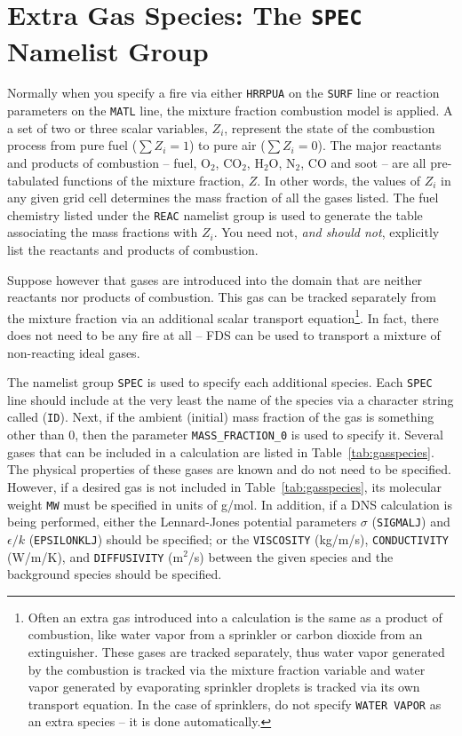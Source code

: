 \documentclass[11pt]{book}
\newcommand{\ct}{\tt\small}
\begin{document}
\section{Extra Gas Species: The \texorpdfstring{{\tt SPEC}}{SPEC} Namelist Group}
\label{info:SPEC}

Normally when you specify a fire via either {\ct HRRPUA} on the {\ct SURF} line or
reaction parameters on the {\ct MATL} line, the mixture fraction combustion model
is applied. A a set of two or three scalar variables, $Z_i$, represent the state of
the combustion process from pure fuel ($\sum Z_i=1$) to pure air ($\sum Z_i=0$).
The major reactants and products of combustion -- fuel, O$_2$, CO$_2$,
H$_2$O, N$_2$, CO and soot -- are all pre-tabulated functions of
the mixture fraction, $Z$. In other words, the values of $Z_i$ in any
given grid cell determines the mass fraction of all the gases listed.
The fuel chemistry listed under the {\ct REAC} namelist
group is used to generate the table associating the mass fractions
with $Z_i$. You need not, {\em and should not},
explicitly list the reactants and products of combustion.

Suppose however that gases are introduced into the
domain that are neither reactants nor products of combustion.
This gas can be tracked separately from the mixture fraction via an additional scalar transport equation\footnote{
Often an extra gas introduced into a calculation is the same as a
product of combustion, like water vapor from a sprinkler or carbon
dioxide from an extinguisher. These gases are tracked separately,
thus water vapor generated by the combustion is tracked via the
mixture fraction variable and water vapor generated by evaporating
sprinkler droplets is tracked via its own transport equation. In the
case of sprinklers, do not specify {\ct WATER VAPOR} as
an extra species -- it is done automatically.}.
In fact, there does not need to be any fire
at all -- FDS can be used to transport a mixture of non-reacting
ideal gases.

The namelist group {\ct SPEC} is used to specify each additional
species. Each {\ct SPEC} line should include at the very least
the name of the species via a character string called ({\ct ID}).
Next, if the ambient (initial) mass fraction of the gas is something
other than 0, then the parameter {\ct MASS\_FRACTION\_0} is used to
specify it.
Several gases that can be included in a calculation are listed in
Table~\ref{tab:gasspecies}. The physical properties
of these gases are known and do not need to be specified. However, if a
desired gas is not included in Table~\ref{tab:gasspecies}, its
molecular weight {\ct MW} must be specified in units of g/mol.
In addition, if a DNS calculation is being performed, either
the Lennard-Jones potential parameters $\sigma$ ({\ct SIGMALJ}) and
$\epsilon/k$ ({\ct EPSILONKLJ}) should be specified; or
the {\ct VISCOSITY} (kg/m/s), {\ct CONDUCTIVITY} (W/m/K), and
{\ct DIFFUSIVITY} (m$^2$/s) between the given species
and the background species should be specified.
\end{document}
